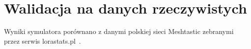 \chapter{Walidacja na danych rzeczywistych}
\label{chap:walidacja}

Wyniki symulatora porównano z danymi polskiej sieci Meshtastic zebranymi przez
serwis lorastats.pl~\cite{lorastats}.
